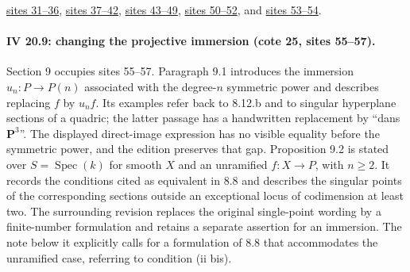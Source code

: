 \documentclass[10pt,a4paper]{article}
\begin{document}
\href{https://grothendieck.umontpellier.fr/web/viewer.html?file=../25.pdf\#page=32}{sites 31--36}, \href{https://grothendieck.umontpellier.fr/web/viewer.html?file=../25.pdf\#page=38}{sites 37--42}, \href{https://grothendieck.umontpellier.fr/web/viewer.html?file=../25.pdf\#page=44}{sites 43--49}, \href{https://grothendieck.umontpellier.fr/web/viewer.html?file=../25.pdf\#page=51}{sites 50--52}, and \href{https://grothendieck.umontpellier.fr/web/viewer.html?file=../25.pdf\#page=54}{sites 53--54}.
\par{}

\par{}
\paragraph{IV 20.9: changing the projective immersion (cote 25, sites 55--57).}
Section 9 occupies sites 55--57. Paragraph 9.1 introduces the immersion $u_n:P\to P(n)$ associated with the degree-$n$ symmetric power and describes replacing $f$ by $u_nf$. Its examples refer back to 8.12.b and to singular hyperplane sections of a quadric; the latter passage has a handwritten replacement by ``dans $\mathbf P^3$''. The displayed direct-image expression has no visible equality before the symmetric power, and the edition preserves that gap. Proposition 9.2 is stated over $S=\operatorname{Spec}(k)$ for smooth $X$ and an unramified $f:X\to P$, with $n\geq2$. It records the conditions cited as equivalent in 8.8 and describes the singular points of the corresponding sections outside an exceptional locus of codimension at least two. The surrounding revision replaces the original single-point wording by a finite-number formulation and retains a separate assertion for an immersion. The note below it explicitly calls for a formulation of 8.8 that accommodates the unramified case, referring to condition (ii bis).
\end{document}
